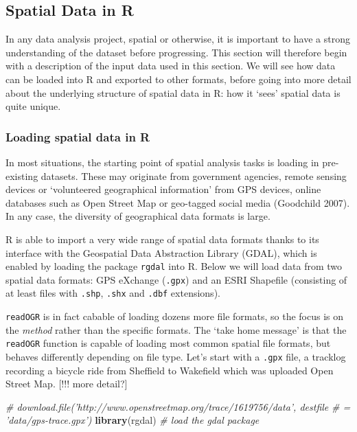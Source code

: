 \documentclass[]{article}
\newenvironment{Shaded}{}{}
\newcommand{\KeywordTok}[1]{\textcolor[rgb]{0.00,0.44,0.13}{\textbf{{#1}}}}
\newcommand{\CommentTok}[1]{\textcolor[rgb]{0.38,0.63,0.69}{\textit{{#1}}}}
\newcommand{\NormalTok}[1]{{#1}}
\begin{document}
\subsection{Spatial Data in R}

In any data analysis project, spatial or otherwise, it is important to
have a strong understanding of the dataset before progressing. This
section will therefore begin with a description of the input data used
in this section. We will see how data can be loaded into R and exported
to other formats, before going into more detail about the underlying
structure of spatial data in R: how it `sees' spatial data is quite
unique.

\subsubsection{Loading spatial data in R}

In most situations, the starting point of spatial analysis tasks is
loading in pre-existing datasets. These may originate from government
agencies, remote sensing devices or `volunteered geographical
information' from GPS devices, online databases such as Open Street Map
or geo-tagged social media (Goodchild 2007). In any case, the diversity
of geographical data formats is large.

R is able to import a very wide range of spatial data formats thanks to
its interface with the Geospatial Data Abstraction Library (GDAL), which
is enabled by loading the package \texttt{rgdal} into R. Below we will
load data from two spatial data formats: GPS eXchange (\texttt{.gpx})
and an ESRI Shapefile (consisting of at least files with \texttt{.shp},
\texttt{.shx} and \texttt{.dbf} extensions).

\texttt{readOGR} is in fact cabable of loading dozens more file formats,
so the focus is on the \emph{method} rather than the specific formats.
The `take home message' is that the \texttt{readOGR} function is capable
of loading most common spatial file formats, but behaves differently
depending on file type. Let's start with a \texttt{.gpx} file, a
tracklog recording a bicycle ride from Sheffield to Wakefield which was
uploaded Open Street Map. {[}!!! more detail?{]}

\begin{Shaded}
\begin{Highlighting}[]
\CommentTok{# download.file('http://www.openstreetmap.org/trace/1619756/data', destfile}
\CommentTok{# = 'data/gps-trace.gpx')}
\KeywordTok{library}\NormalTok{(rgdal)  }\CommentTok{# load the gdal package}
\end{Highlighting}
\end{Shaded}
\end{document}
